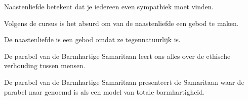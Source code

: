 \documentclass[main.tex]{subfiles}
\begin{document}
\begin{examenvraag}
    \begin{stelling}
        Naastenliefde betekent dat je iedereen even sympathiek moet vinden.
    \end{stelling}

    \begin{antwoord}
    \end{antwoord}
\end{examenvraag}


\begin{examenvraag}
    \begin{stelling}
        Volgens de cursus is het absurd om van de naastenliefde een gebod te maken.
    \end{stelling}

    \begin{antwoord}
    \end{antwoord}
\end{examenvraag}


\begin{examenvraag}
    \begin{stelling}
        De naastenliefde is een gebod omdat ze tegennatuurlijk is.
    \end{stelling}

    \begin{antwoord}
    \end{antwoord}
\end{examenvraag}


\begin{examenvraag}
    \begin{stelling}
        De parabel van de Barmhartige Samaritaan leert ons alles over de ethische verhouding tussen mensen.
    \end{stelling}

    \begin{antwoord}
    \end{antwoord}
\end{examenvraag}


\begin{examenvraag}
    \begin{stelling}
        De parabel van de Barmhartige Samaritaan presenteert de Samaritaan waar de parabel naar genoemd is als een model van totale barmhartigheid.
    \end{stelling}

    \begin{antwoord}
    \end{antwoord}
\end{examenvraag}
\end{document}
